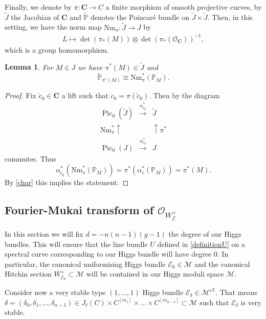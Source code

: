\documentclass[12pt]{article}
\numberwithin{equation}{section}
\newtheorem{lemma}[theorem]{Lemma}
\theoremstyle{remark}
\theoremstyle{definition}
\numberwithin{theorem}{section}
\def\beq{\begin{eqnarray}}
\def\eeq{\end{eqnarray}}
\def\bP{{\mathbb P}}
\def\calE{{\mathcal E}}
\DeclareMathOperator{\Pic}{Pic}
\def\M{{\mathcal{M}}}
\newcommand{\T}{{\mathbb{T}}}
\def\calO{{\mathcal O}}
\def\d{{{\delta}}}
\renewcommand{\1}{\mathbbm{1}}
\begin{document}
Finally, we denote by $\pi:\mathbf{C}\to C$  a finite morphism of smooth projective curves, by  $\tilde{J}$  the Jacobian of $\mathbf{C}$ and  $\tilde{\bP}$ denotes the Poincar\'e bundle on $\tilde{J}\times \tilde{J}$. Then, in this setting,  we have the norm map ${\mathrm{Nm}}_\pi:\tilde{J}\to J$ by \beq \label{norm}L\mapsto \det(\pi_*(M))\otimes \det(\pi_*(\calO_{\mathbf{C}}))^{-1},\eeq which is a group homomorphism. %
\begin{lemma} \label{pullnorm} For $M\in J$ we have $\pi^*(M)\in \tilde{J}$ and $$\tilde{\bP}_{\pi^*(M)}\cong {\mathrm{Nm}}_{\pi}^*(\bP_M).$$ 
\end{lemma}
\begin{proof}  Fix $\tilde{c}_0\in \mathbf{C}$ a lift such that $c_0=\pi(\tilde{c}_0)$. Then by \cite[p. 331]{birkenhake-lange} the diagram $$\begin{array}{lcl} \Pic_0(\tilde{J}) &\stackrel{\alpha_{\tilde{c}_0}^*}{\rightarrow} & \tilde{J}\\  \!\!\!\!\!\!{{\mathrm{Nm}}}_{\pi}^*\uparrow && \uparrow  \pi^*\\ \Pic_0(J) &\stackrel{\alpha^*_{c_0}}{\rightarrow} & {J} \end{array}$$ commutes. Thus $$\alpha_{\tilde{c}_0}^*({\mathrm{Nm}}_{\pi}^*(\bP_M))=\pi^*(\alpha_c^*(\bP_M))=\pi^*(M).$$ By \eqref{char} this implies the statement. 
\end{proof}


\subsection{Fourier-Mukai transform of $\calO_{W_\calE^+}$}

In this section we will fix $d=-n(n-1)(g-1)$ the degree of our Higgs bundles. This will ensure that the line bundle $U$ defined in \eqref{definitionU} on a spectral curve corresponding to our Higgs bundle will have degree $0$. In particular, the canonical uniformising Higgs bundle $\calE_0\in \M$ and the canonical Hitchin section $W^+_{\calE_0}\subset \M$ will be contained in our Higgs moduli space $\M$.   

Consider now a very stable type $(1,\dots,1)$ Higgs bundle 
$\calE_\delta\in \M^{s\T}$. That means  $\delta=(\delta_0,\delta_1,\dots,\delta_{n-1}) \in J_\ell(C)\times C^{[m_1]}\times \dots \times C^{[m_{n-1}]}\subset \M$ such that $\calE_{\d}$ is very stable. %
\end{document}
